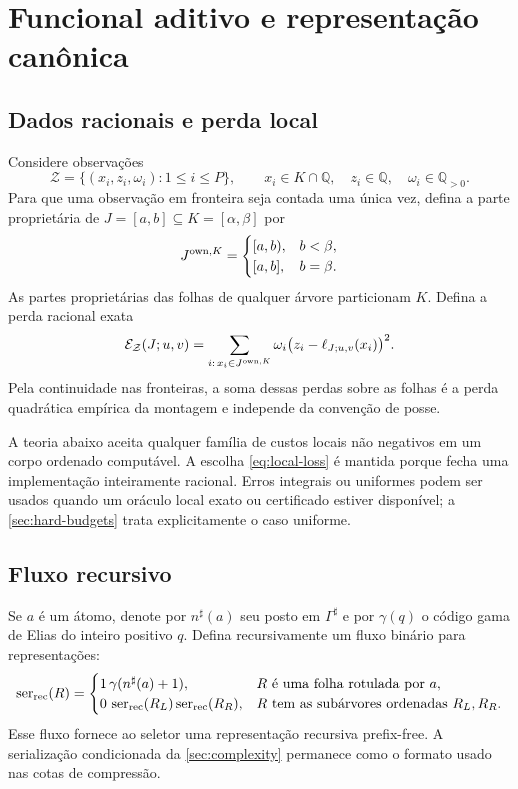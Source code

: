 \section{Funcional aditivo e representação canônica}
\label{sec:functional}

\subsection{Dados racionais e perda local}

Considere observações
\begin{equation}
 \mathcal Z=\{(x_i,z_i,\omega_i):1\le i\le P\},
 \qquad
 x_i\in K\cap\mathbb Q,\quad z_i\in\mathbb Q,\quad
 \omega_i\in\mathbb Q_{>0}.
 \label{eq:rational-data}
\end{equation}
Para que uma observação em fronteira seja contada uma única vez, defina a
parte proprietária de $J=[a,b]\subseteq K=[\alpha,\beta]$ por
\begin{equation}
 J^{\mathrm{own},K}=
 \begin{cases}
 [a,b),&b<\beta,\\
 [a,b],&b=\beta.
 \end{cases}
 \label{eq:relative-ownership}
\end{equation}
As partes proprietárias das folhas de qualquer árvore particionam $K$.
Defina a perda racional exata
\begin{equation}
 \mathcal{E}_{\mathcal Z}(J;u,v)
 =\sum_{i:\,x_i\in J^{\mathrm{own},K}}
 \omega_i\bigl(z_i-\ell_{J;u,v}(x_i)\bigr)^2.
 \label{eq:local-loss}
\end{equation}
Pela continuidade nas fronteiras, a soma dessas perdas sobre as folhas é a
perda quadrática empírica da montagem e independe da convenção de posse.

A teoria abaixo aceita qualquer família de custos locais não negativos em um
corpo ordenado computável. A escolha \eqref{eq:local-loss} é mantida porque
fecha uma implementação inteiramente racional. Erros integrais ou uniformes
podem ser usados quando um oráculo local exato ou certificado estiver
disponível; a \cref{sec:hard-budgets} trata explicitamente o caso uniforme.

\subsection{Fluxo recursivo}

Se $a$ é um átomo, denote por $n^\sharp(a)$ seu posto em $\Gamma^\sharp$ e
por $\gamma(q)$ o código gama de Elias do inteiro positivo $q$. Defina
recursivamente um fluxo binário para representações:
\begin{equation}
 \operatorname{ser}_{\rm rec}(R)=
 \begin{cases}
 1\,\gamma(n^\sharp(a)+1),&R\text{ é uma folha rotulada por }a,\\
 0\,\operatorname{ser}_{\rm rec}(R_L)\operatorname{ser}_{\rm rec}(R_R),
 &R\text{ tem as subárvores ordenadas }R_L,R_R.
 \end{cases}
 \label{eq:recursive-stream}
\end{equation}
Esse fluxo fornece ao seletor uma representação recursiva prefix-free. A
serialização condicionada da \cref{sec:complexity} permanece como o formato
usado nas cotas de compressão.

